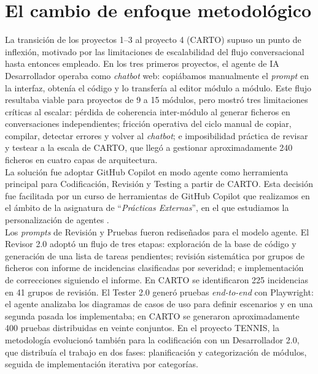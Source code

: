 \section{El cambio de enfoque metodológico} \label{sec:approach-change}

La transición de los proyectos 1--3 al proyecto 4 (\ac{CARTO}) supuso un punto de inflexión, motivado por las limitaciones de escalabilidad del flujo conversacional hasta entonces empleado. En los tres primeros proyectos, el agente de \ac{IA} Desarrollador operaba como \textit{chatbot} web: copiábamos manualmente el \textit{prompt} en la interfaz, obtenía el código y lo transfería al editor módulo a módulo. Este flujo resultaba viable para proyectos de 9 a 15 módulos, pero mostró tres limitaciones críticas al escalar: pérdida de coherencia inter-módulo al generar ficheros en conversaciones independientes; fricción operativa del ciclo manual de copiar, compilar, detectar errores y volver al \textit{chatbot}; e imposibilidad práctica de revisar y testear a la escala de \ac{CARTO}, que llegó a gestionar aproximadamente 240 ficheros en cuatro capas de arquitectura.\\

La solución fue adoptar GitHub Copilot en modo agente como herramienta principal para Codificación, Revisión y Testing a partir de \ac{CARTO}. Esta decisión fue facilitada por un curso de herramientas de GitHub Copilot que realizamos en el ámbito de la asignatura de
``\textit{Prácticas Externas}'', en el que estudiamos la personalización de agentes \cite{URL::TFG}.\\

Los \textit{prompts} de Revisión y Pruebas fueron rediseñados para el modelo agente. El Revisor 2.0 adoptó un flujo de tres etapas: exploración de la base de código y generación de una lista de tareas pendientes; revisión sistemática por grupos de ficheros con informe de incidencias clasificadas por severidad; e implementación de correcciones siguiendo el informe. En \ac{CARTO} se identificaron 225 incidencias en 41 grupos de revisión. El Tester 2.0 generó pruebas \textit{end-to-end} con Playwright: el agente analizaba los diagramas de casos de uso para definir escenarios y en una segunda pasada los implementaba; en \ac{CARTO} se generaron aproximadamente 400 pruebas distribuidas en veinte conjuntos. En el proyecto \ac{TENNIS}, la metodología evolucionó también para la codificación con un Desarrollador 2.0, que distribuía el trabajo en dos fases: planificación y categorización de módulos, seguida de implementación iterativa por categorías.

